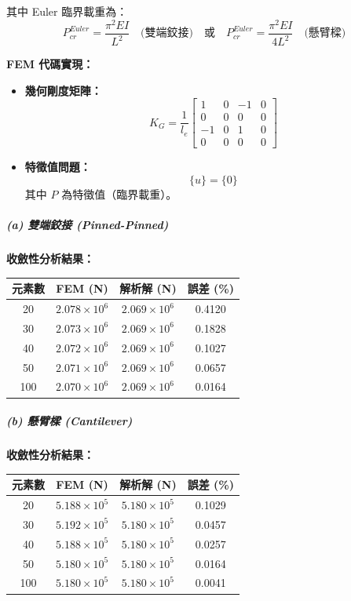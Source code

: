 \documentclass[UTF8, a4paper, 12pt]{ctexart}
\begin{document}
其中 Euler 臨界載重為：
\begin{equation}
  P_{cr}^{Euler} = \frac{\pi^2 EI}{L^2} \quad \text{(雙端鉸接)} \quad \text{或} \quad P_{cr}^{Euler} = \frac{\pi^2 EI}{4L^2} \quad \text{(懸臂樑)}
\end{equation}

\textbf{FEM 代碼實現：}
\begin{itemize}
  \item \textbf{幾何剛度矩陣：}
  \begin{equation}
    K_G = \frac{1}{l_e} \begin{bmatrix} 1 & 0 & -1 & 0 \\ 0 & 0 & 0 & 0 \\ -1 & 0 & 1 & 0 \\ 0 & 0 & 0 & 0 \end{bmatrix}
  \end{equation}
  \item \textbf{特徵值問題：}
  \begin{equation}
    [K - P K_G] \{u\} = \{0\}
  \end{equation}
  其中 $P$ 為特徵值（臨界載重）。
\end{itemize}

\subparagraph{(a) 雙端鉸接 (Pinned-Pinned)}

\textbf{收斂性分析結果：}

\begin{center}
\begin{tabular}{cccc}
\toprule
\textbf{元素數} & \textbf{FEM (N)} & \textbf{解析解 (N)} & \textbf{誤差 (\%)} \\
\midrule
20 & $2.078\times10^6$ & $2.069\times10^6$ & 0.4120 \\
30 & $2.073\times10^6$ & $2.069\times10^6$ & 0.1828 \\
40 & $2.072\times10^6$ & $2.069\times10^6$ & 0.1027 \\
50 & $2.071\times10^6$ & $2.069\times10^6$ & 0.0657 \\
100 & $2.070\times10^6$ & $2.069\times10^6$ & 0.0164 \\
\bottomrule
\end{tabular}
\end{center}

\subparagraph{(b) 懸臂樑 (Cantilever)}

\textbf{收斂性分析結果：}

\begin{center}
\begin{tabular}{cccc}
\toprule
\textbf{元素數} & \textbf{FEM (N)} & \textbf{解析解 (N)} & \textbf{誤差 (\%)} \\
\midrule
20 & $5.188\times10^5$ & $5.180\times10^5$ & 0.1029 \\
30 & $5.192\times10^5$ & $5.180\times10^5$ & 0.0457 \\
40 & $5.188\times10^5$ & $5.180\times10^5$ & 0.0257 \\
50 & $5.180\times10^5$ & $5.180\times10^5$ & 0.0164 \\
100 & $5.180\times10^5$ & $5.180\times10^5$ & 0.0041 \\
\bottomrule
\end{tabular}
\end{center}
\end{document}
